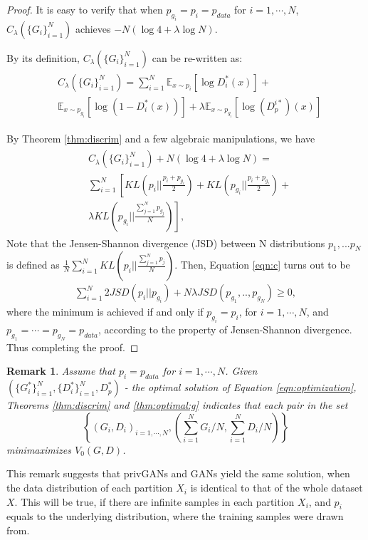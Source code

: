 \documentclass{article}
\newtheorem{remark}{Remark}
\begin{document}
\begin{proof} 
It is easy to verify that when $p_{g_i}=p_i=p_{data}$ for $i=1,\cdots, N$, $C_\lambda(\{G_i\}_{i=1}^N)$ achieves $-N(\log 4 +\lambda \log N)$. 

By its definition, $C_\lambda(\{G_i\}_{i=1}^N)$ can be re-written as: 
\begin{align*}
    \begin{split}
        &C_\lambda(\{G_i\}_{i=1}^N) = \sum_{i=1}^N\mathbb{E}_{x\sim p_{i}}[\log D_i^*(x)] +\\& \mathbb{E}_{x\sim p_{g_i}}[\log(1-D_i^*(x))]+
        \lambda\mathbb{E}_{x\sim p_{g_i}}[\log (D_p^{i*})(x)]
    \end{split}
\end{align*}

By Theorem \ref{thm:discrim} and a few algebraic manipulations, we have 
\begin{align}\label{eqn:c}
    \begin{split}
        & C_\lambda(\{G_i\}_{i=1}^N) + N(\log 4+\lambda\log N) = \\
        & \sum_{i=1}^N \left[ KL(p_i||\frac{p_i+p_{g_i}}{2}) + KL(p_{g_i}||\frac{p_i+p_{g_i}}{2}) + \right.\\
        &\left. \lambda KL(p_{g_i}||\frac{\sum_{j=1}^N p_{g_j}}{N})\right],
    \end{split}
\end{align}
 Note that the Jensen-Shannon divergence (JSD) between N distributions $p_1,...p_N$ is defined as $\frac{1}{N} \sum_{i=1}^N KL(p_i||\frac{\sum_{j=1}^N p_{j}}{N})$. Then, Equation \eqref{eqn:c} turns out to be
\begin{align*}
    \sum_{i=1}^N 2 JSD(p_i||p_{g_i})  + N \lambda JSD(p_{g_1},..,p_{g_N})\ge 0, 
\end{align*}
where the minimum is achieved if and only if $p_{g_i}=p_i$, for $i=1,\cdots, N$, and $p_{g_1}=\cdots=p_{g_N}=p_{data}$, according to the property of Jensen-Shannon divergence. Thus completing the proof. 


\end{proof}

\begin{remark}
Assume that $p_i=p_{data}$ for $i=1,\cdots,N$. Given
$(\{G_i^*\}_{i=1}^N,\{D_i^*\}_{i=1}^N, D_p^*)$ - the optimal solution of Equation \eqref{eqn:optimization}, Theorems \ref{thm:discrim} and \ref{thm:optimal:g} indicates that each pair in the set \[\left\{ (G_i,D_i)_{i=1,\cdots,N}, (\sum\limits_{i=1}^NG_i/N, \sum\limits_{i=1}^ND_i/N) \right\}\] minimaximizes $V_0(G,D)$.
\end{remark}
This remark suggests that privGANs and GANs yield the same solution, when the data distribution of each partition $X_i$ is identical to that of the whole dataset $X$. This will be true, if there are infinite samples in each partition $X_i$, and $p_i$ equals to the underlying distribution, where the training samples were drawn from. 
\end{document}
